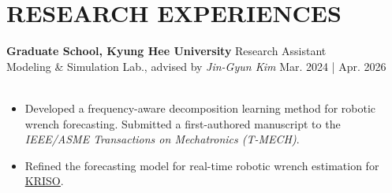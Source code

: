 \documentclass[a4paper,10pt]{extarticle}
\begin{document}
\section*{RESEARCH EXPERIENCES}
\noindent\textbf{Graduate School, Kyung Hee University} \hfill Research Assistant\\
Modeling \& Simulation Lab., advised by \textsl{Jin-Gyun Kim} \hfill Mar. 2024 | Apr. 2026\\
\vspace*{-0.25cm}\\
\begin{minipage}{0.78\textwidth}
	\footnotesize
	\begin{itemize}
		\item Developed a frequency-aware decomposition learning method for robotic wrench forecasting. Submitted a first-authored manuscript to the \textit{IEEE/ASME Transactions on Mechatronics (T-MECH)}.
		\item Refined the forecasting model for real-time robotic wrench estimation for \href{https://www.kriso.re.kr/eng/}{\underline{KRISO}}.
	\end{itemize}
\end{minipage}\\

\end{document}
